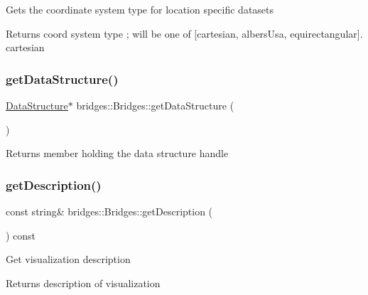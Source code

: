 Gets the coordinate system type for location specific datasets

\begin{DoxyReturn}{Returns}
coord system type ; will be one of \mbox{[}\textquotesingle{}cartesian\textquotesingle{}, \textquotesingle{}albers\+Usa\textquotesingle{}, \textquotesingle{}equirectangular\textquotesingle{}\mbox{]}. \textquotesingle{}cartesian\textquotesingle{} 
\end{DoxyReturn}
\mbox{\label{classbridges_1_1_bridges_a5ddfb17c2fb2d3ca89e7564677251dea}} 
\subsubsection{\texorpdfstring{get\+Data\+Structure()}{getDataStructure()}}
{\footnotesize\ttfamily \hyperlink{classbridges_1_1datastructure_1_1_data_structure}{Data\+Structure}$\ast$ bridges\+::\+Bridges\+::get\+Data\+Structure (\begin{DoxyParamCaption}{ }\end{DoxyParamCaption})\hspace{0.3cm}{\ttfamily [inline]}}

\begin{DoxyReturn}{Returns}
member holding the data structure handle 
\end{DoxyReturn}
\mbox{\label{classbridges_1_1_bridges_ae9f238e1d9fc421c6c08aacb74e0ef6c}} 
\subsubsection{\texorpdfstring{get\+Description()}{getDescription()}}
{\footnotesize\ttfamily const string\& bridges\+::\+Bridges\+::get\+Description (\begin{DoxyParamCaption}{ }\end{DoxyParamCaption}) const\hspace{0.3cm}{\ttfamily [inline]}}

Get visualization description \begin{DoxyReturn}{Returns}
description of visualization 
\end{DoxyReturn}
\mbox{\label{classbridges_1_1_bridges_a8fe8c79b0f852c0049a699c801e40a61}} 
